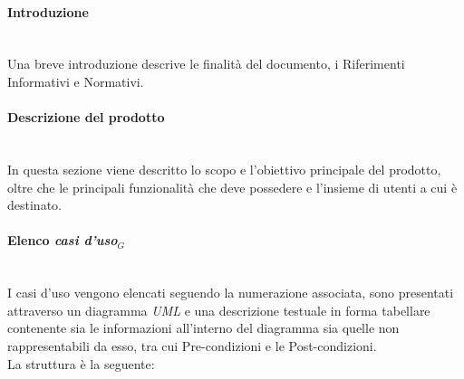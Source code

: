 \documentclass[10pt, letterpaper]{article}
\newcommand{\trisubsection}[1]{\paragraph{#1}\mbox{}\\}
\begin{document}
\trisubsection{Introduzione}
Una breve introduzione descrive le finalità del documento, i Riferimenti Informativi e Normativi.

\trisubsection{Descrizione del prodotto}
In questa sezione viene descritto lo scopo e l'obiettivo principale del prodotto, oltre che  le principali funzionalità
che deve possedere e l'insieme di utenti a cui è destinato.

\trisubsection{Elenco \textit{casi d'uso$_{G}$}}
I {casi d'uso} vengono elencati seguendo la numerazione associata, sono presentati attraverso un diagramma \textit{UML} e una descrizione testuale in forma tabellare contenente sia le informazioni
all'interno del diagramma sia quelle non rappresentabili da esso, tra cui Pre-condizioni e le Post-condizioni.\\
La struttura è la seguente:
\end{document}
